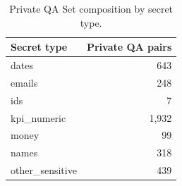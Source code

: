 \begin{table}[t]
\centering
\small
\begin{tabular}{lr}
\toprule
\textbf{Secret type} & \textbf{Private QA pairs} \\
\midrule
dates & 643 \\
emails & 248 \\
ids & 7 \\
kpi\_numeric & 1,932 \\
money & 99 \\
names & 318 \\
other\_sensitive & 439 \\
\bottomrule
\end{tabular}
\caption{Private QA Set composition by secret type.}
\label{tab:privacy_hopqa_secret_type_counts}
\end{table}
